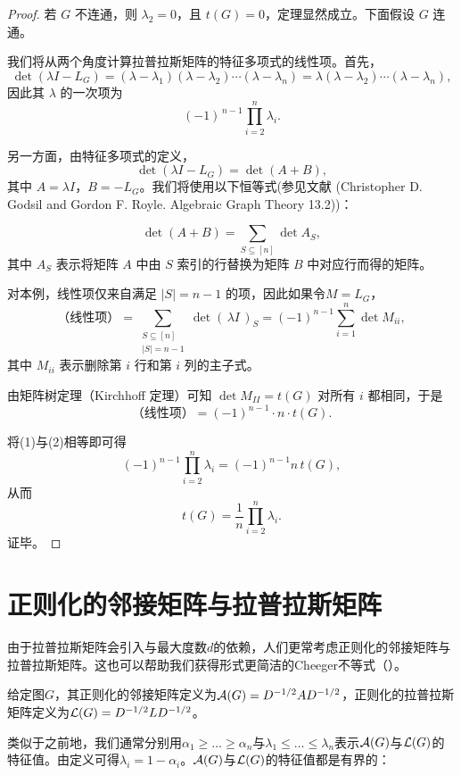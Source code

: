 \begin{proof}
若 $G$ 不连通，则 $\lambda_2=0$，且 $t(G)=0$，定理显然成立。下面假设 $G$ 连通。

我们将从两个角度计算拉普拉斯矩阵的特征多项式的线性项。首先，
\[
\det(\lambda I - L_G)
=(\lambda-\lambda_1)(\lambda-\lambda_2)\cdots(\lambda-\lambda_n)
=\lambda(\lambda-\lambda_2)\cdots(\lambda-\lambda_n),
\]
因此其 $\lambda$ 的一次项为
\[
(-1)^{\,n-1}\prod_{i=2}^n \lambda_i.
\tag{1}
\]

另一方面，由特征多项式的定义，
\[
\det(\lambda I - L_G)=\det(A+B),
\]
其中 $A=\lambda I$，$B=-L_G$。我们将使用以下恒等式(参见文献 (Christopher D. Godsil and Gordon F. Royle. Algebraic Graph Theory 13.2))：

\[
\det(A+B)=\sum_{S\subseteq[n]} \det A_S,
\]
其中 $A_S$ 表示将矩阵 $A$ 中由 $S$ 索引的行替换为矩阵 $B$ 中对应行而得的矩阵。

对本例，线性项仅来自满足 $|S|=n-1$ 的项，因此如果令$M=L_G$，
\[
\text{（线性项）}=\sum_{\substack{S\subseteq[n]\\ |S|=n-1}}
\det(\,\lambda I\,)_S
= (-1)^{n-1}\sum_{i=1}^n \det M_{ii},
\]
其中 $M_{ii}$ 表示删除第 $i$ 行和第 $i$ 列的主子式。

由矩阵树定理（Kirchhoff 定理）可知 $\det M_{II}=t(G)$ 对所有 $i$ 都相同，于是
\[
\text{（线性项）}=(-1)^{n-1}\cdot n\cdot t(G).
\tag{2}
\]

将(1)与(2)相等即可得
\[
(-1)^{n-1}\prod_{i=2}^n \lambda_i
=
(-1)^{n-1} n\,t(G),
\]
从而
\[
t(G)=\frac{1}{n}\prod_{i=2}^n \lambda_i.
\]
证毕。
\end{proof}





\section{正则化的邻接矩阵与拉普拉斯矩阵}
由于拉普拉斯矩阵会引入与最大度数$d$的依赖，人们更常考虑正则化的邻接矩阵与拉普拉斯矩阵。这也可以帮助我们获得形式更简洁的Cheeger不等式（）。

\begin{definition}[正则化的邻接矩阵与拉普拉斯矩阵]
    给定图$G$，其正则化的邻接矩阵定义为$\mathcal{A}(G)=D^{-1/2}AD^{-1/2}$，正则化的拉普拉斯矩阵定义为$\mathcal{L}(G)=D^{-1/2}LD^{-1/2}$。
\end{definition}

类似于之前地，我们通常分别用$\alpha_1\geq\dots\geq\alpha_n$与$\lambda_1\leq\dots\leq\lambda_n$表示$\mathcal{A}(G)$与$\mathcal{L}(G)$的特征值。由定义可得$\lambda_i=1-\alpha_i$。$\mathcal{A}(G)$与$\mathcal{L}(G)$的特征值都是有界的：

